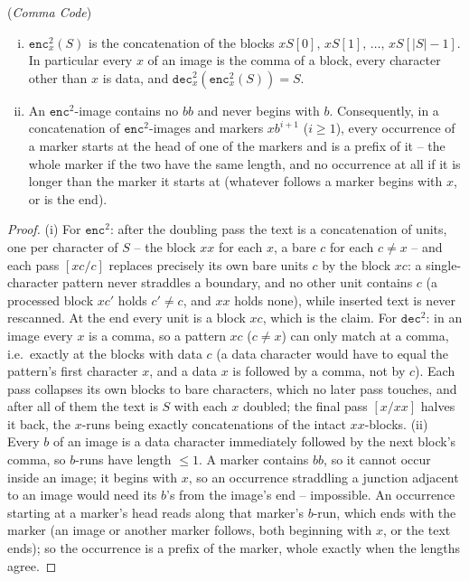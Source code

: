 \documentclass[runningheads,envcountsect]{llncs}
\begin{document}
\begin{lemma}
    (\emph{Comma Code})
    \begin{enumerate}[(i)]
        \item $\mathtt{enc}^2_{x}(S)$ is the concatenation of the blocks $xS[0],\, xS[1],\, \dots,\, xS[|S|-1]$. In particular every $x$ of an image is the comma of a block, every character other than $x$ is data, and $\mathtt{dec}^2_{x}(\mathtt{enc}^2_{x}(S)) = S$.
        \item An $\mathtt{enc}^2$-image contains no $bb$ and never begins with $b$. Consequently, in a concatenation of $\mathtt{enc}^2$-images and markers $xb^{i+1}$ ($i \geq 1$), every occurrence of a marker starts at the head of one of the markers and is a prefix of it -- the whole marker if the two have the same length, and no occurrence at all if it is longer than the marker it starts at (whatever follows a marker begins with $x$, or is the end).
    \end{enumerate}
\end{lemma}

\begin{proof}
    (i) For $\mathtt{enc}^2$: after the doubling pass the text is a concatenation of units, one per character of $S$ -- the block $xx$ for each $x$, a bare $c$ for each $c \neq x$ -- and each pass $[xc/c]$ replaces precisely its own bare units $c$ by the block $xc$: a single-character pattern never straddles a boundary, and no other unit contains $c$ (a processed block $xc'$ holds $c' \neq c$, and $xx$ holds none), while inserted text is never rescanned. At the end every unit is a block $xc$, which is the claim. For $\mathtt{dec}^2$: in an image every $x$ is a comma, so a pattern $xc$ ($c \neq x$) can only match at a comma, i.e.\ exactly at the blocks with data $c$ (a data character would have to equal the pattern's first character $x$, and a data $x$ is followed by a comma, not by $c$). Each pass collapses its own blocks to bare characters, which no later pass touches, and after all of them the text is $S$ with each $x$ doubled; the final pass $[x/xx]$ halves it back, the $x$-runs being exactly concatenations of the intact $xx$-blocks.
    (ii) Every $b$ of an image is a data character immediately followed by the next block's comma, so $b$-runs have length $\leq 1$. A marker contains $bb$, so it cannot occur inside an image; it begins with $x$, so an occurrence straddling a junction adjacent to an image would need its $b$'s from the image's end -- impossible. An occurrence starting at a marker's head reads along that marker's $b$-run, which ends with the marker (an image or another marker follows, both beginning with $x$, or the text ends); so the occurrence is a prefix of the marker, whole exactly when the lengths agree.
\end{proof}
\end{document}
